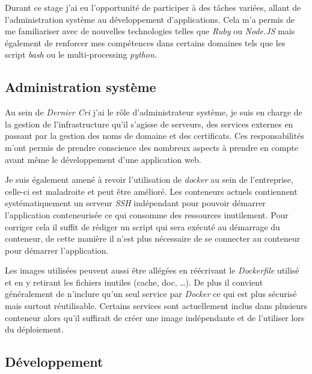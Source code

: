\documentclass[12pt,a4paper]{article}
\begin{document}
  \bigskip

  Durant ce stage j'ai eu l'opportunité de participer à des tâches
  variées, allant de l'administration système au développement
  d'applications. Cela m'a permis de me familiariser avec de nouvelles
  technologies telles que \emph{Ruby} ou \emph{Node.JS} mais également de
  renforcer mes compétences dans certains domaines tels que les script
  \emph{bash} ou le multi-processing \emph{python}.

  \subsection{Administration système}\label{administration-systuxe8me}

  \bigskip

  Au sein de \emph{Dernier Cri} j'ai le rôle d'administrateur système, je
  suis en charge de la gestion de l'infrastructure qu'il s'agisse de
  serveurs, des services externes en passant par la gestion des noms de
  domaine et des certificats. Ces responsabilités m'ont permis de prendre
  conscience des nombreux aspects à prendre en compte avant même le
  développement d'une application web.

  \bigskip

  Je suis également amené à revoir l'utilisation de \emph{docker} au sein
  de l'entreprise, celle-ci est maladroite et peut être amélioré. Les
  conteneurs actuels contiennent systématiquement un serveur \emph{SSH}
  indépendant pour pouvoir démarrer l'application conteneurisée ce qui
  consomme des ressources inutilement. Pour corriger cela il suffit de
  rédiger un script qui sera exécuté au démarrage du conteneur, de cette
  manière il n'est plus nécessaire de se connecter au conteneur pour
  démarrer l'application.

  \bigskip

  Les images utilisées peuvent aussi être allégées en réécrivant le
  \emph{Dockerfile} utilisé et en y retirant les fichiers inutiles (cache,
  doc, \ldots{}). De plus il convient généralement de n'inclure qu'un seul
  service par \emph{Docker} ce qui est plus sécurisé mais surtout
  réutilisable. Certains services sont actuellement inclus dans plusieurs
  conteneur alors qu'il suffirait de créer une image indépendante et de
  l'utiliser lors du déploiement.

  \newpage

  \subsection{Développement}\label{duxe9veloppement}
\end{document}
